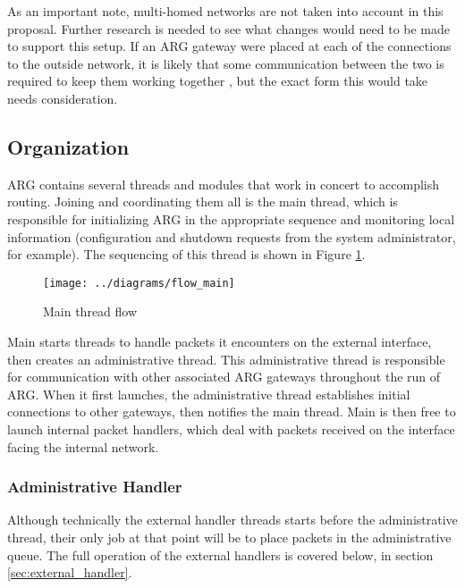 \par As an important note, multi-homed networks are not taken into account in this proposal. Further research is needed to see what changes would need to be made to support this setup. If an ARG gateway were placed at each of the connections to the outside network, it is likely that some communication between the two is required to keep them working together \cite{SandiaDynat}, but the exact form this would take needs consideration.

\subsection{Organization}
\par ARG contains several threads and modules that work in concert to accomplish routing. Joining and coordinating them all is the main thread, which is responsible for initializing ARG in the appropriate sequence and monitoring local information (configuration and shutdown requests from the system administrator, for example). The sequencing of this thread is shown in Figure \ref{fig:flow_main}.

\begin{figure}
	\centering
	\texttt{[image: ../diagrams/flow\_main]}
	\caption{Main thread flow}
	\label{fig:flow_main}
\end{figure}

\par Main starts threads to handle packets it encounters on the external interface, then creates an administrative thread. This administrative thread is responsible for communication with other associated ARG gateways throughout the run of ARG. When it first launches, the administrative thread establishes initial connections to other gateways, then notifies the main thread. Main is then free to launch internal packet handlers, which deal with packets received on the interface facing the internal network.

\subsubsection{Administrative Handler}
\label{sec:admin_handler}

\par Although technically the external handler threads starts before the administrative thread, their only job at that point will be to place packets in the administrative queue. The full operation of the external handlers is covered below, in section \ref{sec:external_handler}.

